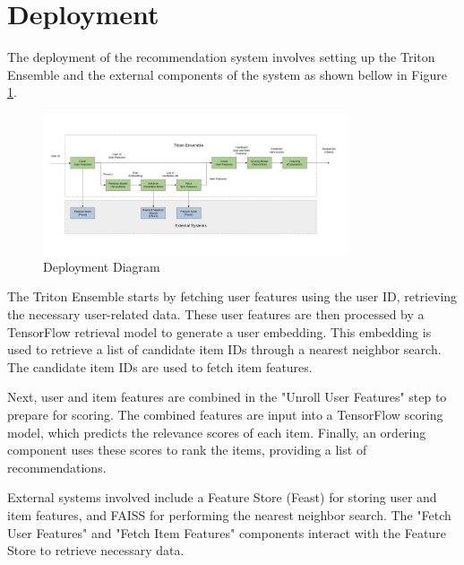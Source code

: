 \section{Deployment}

The deployment of the recommendation system involves setting up the Triton Ensemble and the external components of the system as shown bellow in Figure \ref{fig:DeploymentDiagram}.

\begin{figure}[H]
    \centering
    \includegraphics[width=0.8\textwidth]{assets/deployment.jpg}
    \caption{Deployment Diagram}
    \label{fig:DeploymentDiagram}
\end{figure}

The Triton Ensemble starts by fetching user features using the user ID, retrieving the necessary user-related data. These user features are then processed by a TensorFlow retrieval model to generate a user embedding. This embedding is used to retrieve a list of candidate item IDs through a nearest neighbor search. The candidate item IDs are used to fetch item features.

Next, user and item features are combined in the "Unroll User Features" step to prepare for scoring. The combined features are input into a TensorFlow scoring model, which predicts the relevance scores of each item. Finally, an ordering component uses these scores to rank the items, providing a list of recommendations.

External systems involved include a Feature Store (Feast) for storing user and item features, and FAISS for performing the nearest neighbor search. The "Fetch User Features" and "Fetch Item Features" components interact with the Feature Store to retrieve necessary data.